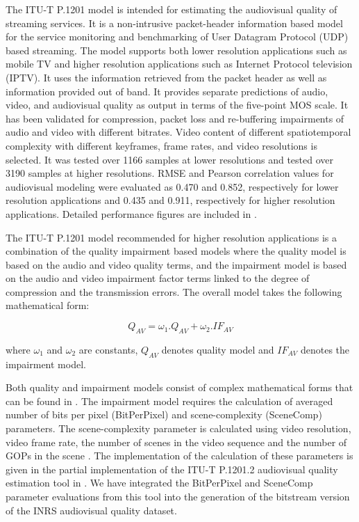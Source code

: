 \documentclass[journal]{IEEEtran}
\begin{document}
The ITU-T P.1201 \cite{itut2012P.1201} model is intended for estimating the audiovisual quality of streaming services. It is a non-intrusive packet-header information based model for the service monitoring and benchmarking of User Datagram Protocol (UDP) based streaming.  The model supports both lower resolution applications such as mobile TV and higher resolution applications such as Internet Protocol television (IPTV). It uses the information retrieved from the packet header as well as information provided out of band. It provides separate predictions of audio, video, and audiovisual quality as output in terms of the five-point MOS scale. It has been validated for compression, packet loss and re-buffering impairments of audio and video with different bitrates. Video content of different spatiotemporal complexity with different keyframes, frame rates, and video resolutions is selected. It was tested over 1166 samples at lower resolutions and tested over 3190 samples at higher resolutions. RMSE and Pearson correlation \cite{garcia2014parametric} values for audiovisual modeling were evaluated as 0.470 and 0.852, respectively for lower resolution applications and 0.435 and 0.911, respectively for higher resolution applications. Detailed performance figures are included in  \cite{itut2012P.1201}.


The ITU-T P.1201 model recommended for higher resolution applications \cite{itut2012P.1201.2} is a combination of the quality impairment based models where the quality model is based on the audio and video quality terms, and the impairment model is based on the audio and video impairment factor terms linked to the degree of compression and the transmission errors. The overall model takes the following mathematical form:

\vspace{-0.2cm}
\begin{equation}
\label{eq:p12012}
Q_{AV} = \omega_{1} .Q_{AV} + \omega_{2} .IF_{AV}
\end{equation}

where \(\omega_{1}\) and \(\omega_{2}\) are constants, \(Q_{AV}\) denotes quality model and \(IF_{AV}\) denotes the impairment model.

Both quality and impairment models consist of complex mathematical forms that can be found in \cite{itut2012P.1201.2}. The impairment model requires the calculation of averaged number of bits per pixel (BitPerPixel) and scene-complexity (SceneComp) parameters. The scene-complexity parameter is calculated using video resolution, video frame rate, the number of scenes in the video sequence and the number of GOPs in the scene \cite{itut2012P.1201.2}. The implementation of the calculation of these parameters is given in the partial implementation of the ITU-T P.1201.2 audiovisual quality estimation tool in \cite{itut2012P.1201.2_tool}. We have integrated the BitPerPixel and SceneComp parameter evaluations from this tool into the generation of the bitstream version of the INRS audiovisual quality dataset.
\end{document}
